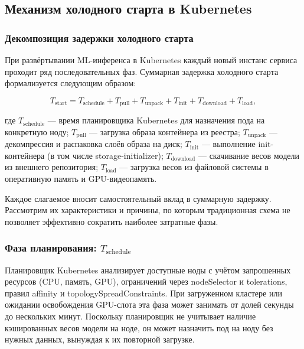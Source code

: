 \subsection{Механизм холодного старта в Kubernetes}

\subsubsection{Декомпозиция задержки холодного старта}

При развёртывании ML-инференса в Kubernetes каждый новый инстанс сервиса проходит ряд последовательных фаз. Суммарная задержка холодного старта формализуется следующим образом:

\begin{equation}
T_{\mathrm{start}} = T_{\mathrm{schedule}} + T_{\mathrm{pull}} + T_{\mathrm{unpack}} + T_{\mathrm{init}} + T_{\mathrm{download}} + T_{\mathrm{load}},
\label{eq:cold_start}
\end{equation}

где $T_{\mathrm{schedule}}$ --- время планировщика Kubernetes для назначения пода на конкретную ноду; $T_{\mathrm{pull}}$ --- загрузка образа контейнера из реестра; $T_{\mathrm{unpack}}$ --- декомпрессия и распаковка слоёв образа на диск; $T_{\mathrm{init}}$ --- выполнение init-контейнера (в том числе storage-initializer); $T_{\mathrm{download}}$ --- скачивание весов модели из внешнего репозитория; $T_{\mathrm{load}}$ --- загрузка весов из файловой системы в оперативную память и GPU-видеопамять.

Каждое слагаемое вносит самостоятельный вклад в суммарную задержку. Рассмотрим их характеристики и причины, по которым традиционная схема не позволяет эффективно сократить наиболее затратные фазы.

\subsubsection{Фаза планирования: $T_{\mathrm{schedule}}$}

Планировщик Kubernetes анализирует доступные ноды с учётом запрошенных ресурсов (CPU, память, GPU), ограничений через nodeSelector и tolerations, правил affinity и topologySpreadConstraints. При загруженном кластере или ожидании освобождения GPU-слота эта фаза может занимать от долей секунды до нескольких минут. Поскольку планировщик не учитывает наличие кэшированных весов модели на ноде, он может назначить под на ноду без нужных данных, вынуждая к их повторной загрузке.

